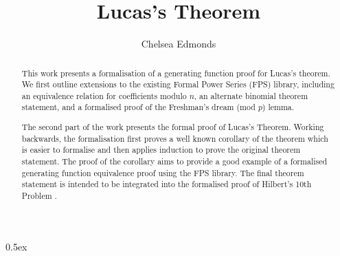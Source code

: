 \documentclass[11pt,a4paper]{article}
\begin{document}
\title{Lucas's Theorem}
\author{Chelsea Edmonds}
\maketitle

\begin{abstract}
  This work presents a formalisation of a generating function proof for Lucas's theorem. We first outline extensions to the existing Formal Power Series (FPS) library, including an equivalence relation for coefficients modulo $n$, an alternate binomial theorem statement, and a formalised proof of the Freshman's dream (mod $p$) lemma.

  The second part of the work presents the formal proof of Lucas's Theorem. Working backwards, the formalisation first proves a well known corollary of the theorem which is easier to formalise and then applies induction to prove the original theorem statement. The proof of the corollary aims to provide a good example of a formalised generating function equivalence proof using the FPS library. The final theorem statement is intended to be integrated into the formalised proof of Hilbert's 10th Problem \cite{bayerDPRMTheoremIsabelle2019}.
\end{abstract}

\tableofcontents

\parindent 0pt\parskip 0.5ex





\end{document}
